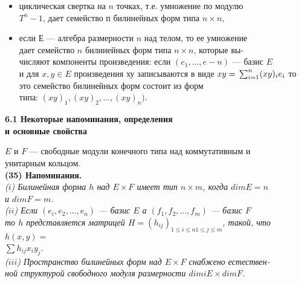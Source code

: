 \documentclass{mai_book}
\begin{document}
{\begin{itemize}
		из пр билинейных форм типа $nm\times mp$ (элемент с индексами ($i,j$) \\
		в произведении матриц есть скалярное произведение $i$-й строки \\
		первой матрицы на $j$-и столбец второй), 
		\item  циклическая свертка на $n$ точках, т.е. умножение по модулю\\
		$T^n - 1$, дает семейство п билинейных форм типа $n\times n$, 
		\item если $Е$ — алгебра размерности $n$ над телом, то ее умножение \\
		дает семейство $n$ билинейных форм типа $n\times n$, которые  
		вы-\\числяют компоненты произведения: если $(e_1,\ldots,e-n)$ — базис $E$\\ 
		и для $x, y \in E$ произведения ху записываются в виде $xy =\\ \sum_{i=1}^n (xy)_ie_i$ то это семейство билинейных форм состоит из форм\\
		типа: {$(xy)_1, (xy)_2,\ldots, (xy)_n)$}. 
	\end{itemize}
\medskip
	\begin{large}
 \begin{flushleft} 
			\noindent\textbf{6.1 Некоторые напоминания, определения \\
			\indent и основные свойства}
		\end{flushleft}
	\end{large} 
	 $E$ и $F$ — свободные модули конечного типа над коммутативным и \\
	унитарным кольцом. 	\\
	
	\noindent \textbf{(35) Напоминания. }\\
	\indent \textit{ ($i$) Билинейная форма $h$ над $E\times F$ имеет тип $n\times m$, когда $dim E = n$\\ 
		и $dim F = m$. }\\
	\indent \textit{($ii$) Если $(e_i,e_2,\ldots,e_n)$ — базис $E$ а $(f_1, f_2, \ldots, f_m)$ — базис $F$ \\  
		то $h$ представляется матрицей $H = (h_{ij})_{
			1\leq i \leq n 
			1 \leq j \leq m
		}$, такой, что $h(x,y) =$ \\ $\sum h_{ij}x_iy_j$. }\\
	\indent \textit{($iii$) Пространство билинейных форм над $E\times F$ снабжено  
		естествен-\\ной структурой свободного модуля размерности $dimi E \times dim F$. }\\
	
}
\end{document}
